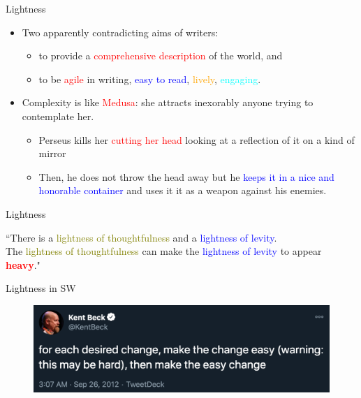 \documentclass{beamer}
\begin{document}
\begin{frame}
{\centerline{Lightness}}

\begin{itemize}
\item Two apparently contradicting aims of writers:
\begin{itemize}
\item to provide a \textcolor{red}{comprehensive description} of the world, and
\item to be \textcolor{red}{agile} in writing, \textcolor{blue}{easy to read}, \textcolor{orange}{lively}, \textcolor{cyan}{engaging}. 
\end{itemize}
\vspace{0.5cm}
\item Complexity is like \textcolor{red}{Medusa}: she attracts inexorably anyone trying to contemplate her. 
\begin{itemize}
\item Perseus kills her \textcolor{red}{cutting her head} looking at a reflection of it on a kind of mirror
\item Then, he does not throw the head away but he \textcolor{blue}{keeps it in a nice and honorable container} and uses it it as a weapon against his enemies.
\end{itemize}
\end{itemize}

\end{frame}

\begin{frame}
{\centerline{Lightness}}
\Large
\begin{tcolorbox}[fonttitle=\bfseries,nobeforeafter,center title,colback=yellow!5,colframe=yellow!40!black,title=Calvino]
    ``There is a \textcolor{olive}{lightness of thoughtfulness} and a \textcolor{blue}{lightness of levity}. \\
    
    The \textcolor{olive}{lightness of thoughtfulness} can make the \textcolor{blue}{lightness of levity} to appear \textcolor{red}{\bf heavy}."
\end{tcolorbox}

\end{frame}

\begin{frame}
{\centerline{Lightness in SW}}

\begin{figure}[htp]
    \centering
     \includegraphics[width=.9\textwidth]{P2023.AIBCCSS.StoryTelling/EasyChangeBeck.png}
    \label{F:EasyChangeBeck}
\end{figure}

\end{frame}
\end{document}
